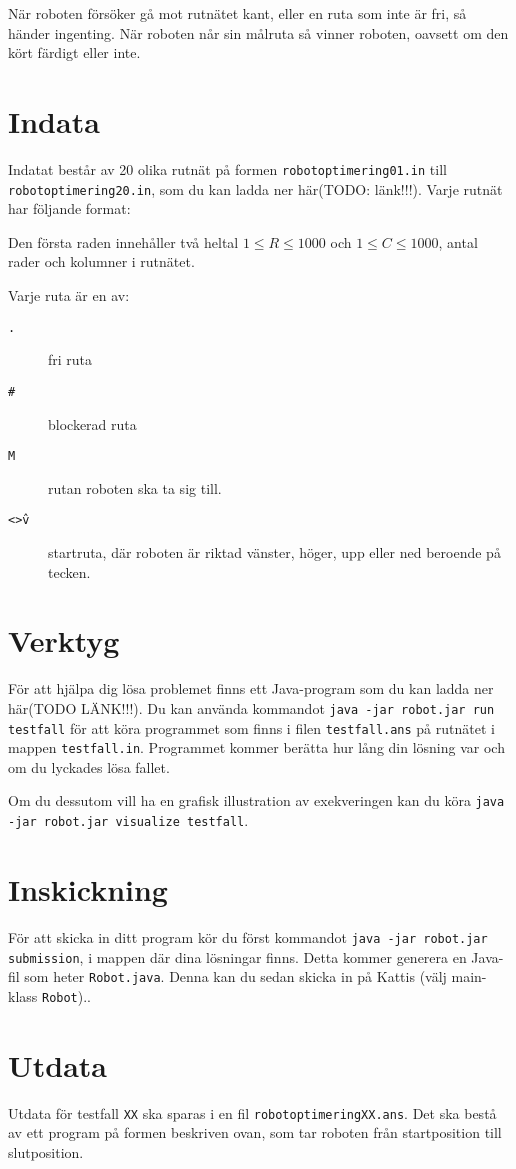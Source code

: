När roboten försöker gå mot rutnätet kant, eller en ruta som inte är fri, så händer ingenting. När roboten når sin målruta så vinner roboten, oavsett om den kört färdigt eller inte.

\section*{Indata}
Indatat består av 20 olika rutnät på formen \texttt{robotoptimering01.in} till \texttt{robotoptimering20.in}, som du kan ladda ner här(TODO: länk!!!). Varje rutnät har följande format:

Den första raden innehåller två heltal $1 \le R \le 1000$ och $1 \le C \le 1000$, antal rader och kolumner i rutnätet.

Varje ruta är en av:
\begin{description}
  \item[\texttt{.}] fri ruta
  \item[\texttt{\#}] blockerad ruta
  \item[\texttt{M}] rutan roboten ska ta sig till.
  \item[\texttt{<>\^v}] startruta, där roboten är riktad vänster, höger, upp eller ned beroende på tecken.
\end{description}

\section*{Verktyg}
För att hjälpa dig lösa problemet finns ett Java-program som du kan ladda ner här(TODO LÄNK!!!). Du kan använda kommandot \texttt{java -jar robot.jar run testfall} för att köra programmet som finns i filen \texttt{testfall.ans} på rutnätet i mappen \texttt{testfall.in}. Programmet kommer berätta hur lång din lösning var och om du lyckades lösa fallet.

Om du dessutom vill ha en grafisk illustration av exekveringen kan du köra \texttt{java -jar robot.jar visualize testfall}.

\section*{Inskickning}
För att skicka in ditt program kör du först kommandot \texttt{java -jar robot.jar submission}, i mappen där dina lösningar finns. Detta kommer generera en Java-fil som heter \texttt{Robot.java}. Denna kan du sedan skicka in på Kattis (välj main-klass \texttt{Robot})..

\section*{Utdata}
Utdata för testfall \texttt{XX} ska sparas i en fil \texttt{robotoptimeringXX.ans}. Det ska bestå av ett program på formen beskriven ovan, som tar roboten från startposition till slutposition.

